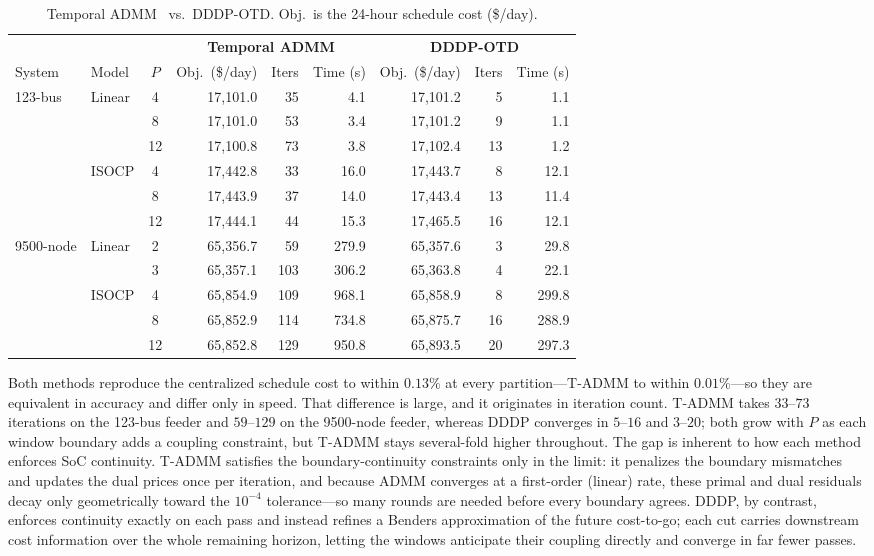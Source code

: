 \begin{table}[t]
\centering
\caption{Temporal ADMM~\cite{PiBe20} vs.\ DDDP-OTD.
         Obj.\ is the 24-hour schedule cost (\$/day).}
\label{tab:tadmm}
\small
\setlength{\tabcolsep}{3.5pt}
\begin{tabular}{l l c rrr rrr}
\toprule
 & & & \multicolumn{3}{c}{\textbf{Temporal ADMM}} & \multicolumn{3}{c}{\textbf{DDDP-OTD}} \\
\cmidrule(lr){4-6}\cmidrule(lr){7-9}
System & Model & $P$ & Obj.\ (\$/day) & Iters & Time (s) & Obj.\ (\$/day) & Iters & Time (s) \\
\midrule
\multirow{6}{*}{123-bus}
 & \multirow{3}{*}{Linear}
   & 4  & 17{,}101.0 & 35 &  4.1 & 17{,}101.2 &  5 & 1.1 \\
 & & 8  & 17{,}101.0 & 53 &  3.4 & 17{,}101.2 &  9 & 1.1 \\
 & & 12 & 17{,}100.8 & 73 &  3.8 & 17{,}102.4 & 13 & 1.2 \\
\cmidrule{2-9}
 & \multirow{3}{*}{ISOCP}
   & 4  & 17{,}442.8 & 33 & 16.0 & 17{,}443.7 &  8 & 12.1 \\
 & & 8  & 17{,}443.9 & 37 & 14.0 & 17{,}443.4 & 13 & 11.4 \\
 & & 12 & 17{,}444.1 & 44 & 15.3 & 17{,}465.5 & 16 & 12.1 \\
\midrule
\multirow{5}{*}{9500-node}
 & \multirow{2}{*}{Linear}
   & 2 & 65{,}356.7 &  59 & 279.9 & 65{,}357.6 &  3 & 29.8 \\
 & & 3 & 65{,}357.1 & 103 & 306.2 & 65{,}363.8 &  4 & 22.1 \\
\cmidrule{2-9}
 & \multirow{3}{*}{ISOCP}
   & 4  & 65{,}854.9 & 109 &  968.1 & 65{,}858.9 &  8 & 299.8 \\
 & & 8  & 65{,}852.9 & 114 &  734.8 & 65{,}875.7 & 16 & 288.9 \\
 & & 12 & 65{,}852.8 & 129 &  950.8 & 65{,}893.5 & 20 & 297.3 \\
\bottomrule
\end{tabular}
\end{table}

Both methods reproduce the centralized schedule cost to within $0.13\%$ at
every partition---T-ADMM to within $0.01\%$---so they are equivalent in accuracy
and differ only in speed. That difference is large, and it originates in
iteration count. T-ADMM takes $33$--$73$ iterations on the 123-bus feeder and
$59$--$129$ on the 9500-node feeder, whereas DDDP converges in $5$--$16$ and
$3$--$20$; both grow with $P$ as each window boundary adds a coupling
constraint, but T-ADMM stays several-fold higher throughout. The gap is
inherent to how each method enforces SoC continuity. T-ADMM satisfies the
boundary-continuity constraints only in the limit: it penalizes the boundary
mismatches and updates the dual prices once per iteration, and because ADMM
converges at a first-order (linear) rate, these primal and dual residuals decay
only geometrically toward the $10^{-4}$ tolerance---so many rounds are needed
before every boundary agrees. DDDP, by contrast, enforces continuity exactly on
each pass and instead refines a Benders approximation of the future cost-to-go;
each cut carries downstream cost information over the whole remaining horizon,
letting the windows anticipate their coupling directly and converge in far fewer
passes.

